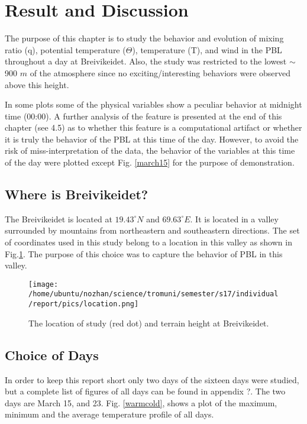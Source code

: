 \documentclass[a4paper,12pt]{article}
\numberwithin{equation}{section} %
\begin{document}
\newpage

\section{Result and Discussion}

The purpose of this chapter is to study the behavior and evolution of mixing ratio (q), potential temperature ($\Theta$), temperature (T), and wind in the PBL throughout a day at Breivikeidet. Also, the study was restricted to the lowest $\sim$ 900 $m$ of the atmosphere since no exciting/interesting behaviors were observed above this height.

In some plots some of the physical variables show a peculiar behavior at midnight time (00:00). A further analysis of the feature is presented at the end of this chapter (see 4.5) as to whether this feature is a computational artifact or whether it is truly the behavior of the PBL at this time of the day. However, to avoid the risk of miss-interpretation of the data, the behavior of the variables at this time of the day were plotted except Fig. \ref{march15} for the purpose of demonstration.

\subsection{Where is Breivikeidet?}

The Breivikeidet is located at $19.43^\circ N$ and $69.63^\circ E$. It is located in a valley surrounded by mountains from northeastern and southeastern directions. The set of coordinates used in this study belong to a location in this valley as shown in Fig.\ref{location}. The purpose of this choice was to capture the behavior of PBL in this valley.

\begin{figure}[bhp]
\texttt{[image: /home/ubuntu/nozhan/science/tromuni/semester/s17/individual/report/pics/location.png]}
\caption{The location of study (red dot) and terrain height at Breivikeidet.}
\label{location}
\end{figure}

\subsection{Choice of Days}
In order to keep this report short only two days of the sixteen days were studied, but a complete list of figures of all days can be found in appendix ?. The two days are March 15, and 23. Fig. \ref{warmcold}, shows a plot of the maximum, minimum and the average temperature profile of all days.
\end{document}
